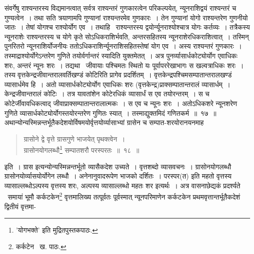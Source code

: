 \documentclass[11pt, openany]{book}
\begin{document}
\noindent संवर्गेषु राश्यन्तरस्य विद्यमानत्वात् सर्वत्र राश्यन्तरं गुणकारत्वेन परिकल्पयेत्, न्यूनराशिद्वयं राश्यन्तरं च गुण्यत्वेन~। तथा सति त्रयाणामपि गुण्यानां राश्यन्तरमेव गुणकारः~। तेन गुण्यानां योगो राश्यन्तरेण गुणनीयो जातः~। तेषां योगश्च राश्योर्योग एव~। तथाहि \textendash\ राश्यन्तरस्य द्वयोर्न्यूनराश्योश्चात्र योगः कर्तव्यः~। तत्रैकस्य न्यूनराशेः राश्यन्तरस्य च योगे कृते सोऽधिकराशिर्भवति, अन्तरसहितस्य न्यूनराशेरधिकराशित्वात्~। तस्मिन् पुनरितरो न्यूनराशिर्योजनीयः ततोऽधिकराशिर्न्यूनराशिसहितस्तेषां योग एव~। अस्य राश्यन्तरं गुणकारः~। तस्माद्राश्योर्योगेऽन्तरेण गुणिते तयोर्वर्गान्तरं स्यादिति युक्तमेतत्~। अत्र पुनर्व्यासार्धकोट्योर्योग एवाधिकः शरः, अन्तरं न्यूनः शरः~। तद्यथा \textendash\ जीवायाः पश्चिमतः स्थितो यः पूर्वापररेखाभागः स खल्वत्राधिकः शरः~। तस्य वृत्तकेन्द्रजीवान्तरालवर्तिखण्डं कोटिरिति प्रागेव प्रदर्शितम्~। वृत्तकेन्द्रपश्चिमसम्पातान्तरालखण्डं व्यासार्धमेव हि~। अतो व्यासार्धकोट्योर्योग एवाधिकः शरः (वृत्तकेन्द्र)प्राक्सम्पातान्तरालं व्यासार्धम्~। केन्द्रजीवान्तरालं कोटिः~। तत्र यावतांशेन कोटेरधिकं व्यासार्धं स एव तयोरन्तरम्~। स च कोटेर्जीवावधिकत्वाद् जीवाप्राक्सम्पातान्तरालात्मकः~। स एव च न्यूनः शरः~। अतोऽधिकशरे न्यूनशरेण गुणिते व्यासार्धकोट्योर्योगस्तयोरन्तरेण गुणितः स्यात्~। तस्माद्युक्तमिदं गणितकर्म~॥~१७~॥\\

अथान्योन्यस्मिन्नन्तर्भूतैकदेशयोर्विषमयोर्वृत्तयोर्व्यासाभ्यां ग्रासेन च सम्पात-शरयोरानयनमाह\textendash 

\begin{quote}
{\ab ग्रासोने द्वे वृत्ते ग्रासगुणे भाजयेत् पृथक्त्वेन~।\\
ग्रासोनयोगलब्धौ\renewcommand{\thefootnote}{*}\footnote{'योगभक्ते' इति मुद्रितपुस्तकपाठः.} सम्पातशरौ परस्परतः~॥~१८~॥}
\end{quote}

इति~। ग्रास इत्यन्योन्यस्मिन्नन्तर्भूतो व्यासैकदेश उच्यते~। वृत्तशब्दो व्यासवचनः~। ग्रासोनयोगलब्धौ ग्रासोनयोर्व्यासयोर्योगेन लब्धौ~। अनेनानुवादरूपेण भाजको दर्शितः~। परस्पर(त) इति महतो वृत्तस्य व्यासाल्लब्धोऽल्पस्य वृत्तस्य शरः, अल्पस्य व्यासाल्लब्धो महतः शर इत्यर्थः~। अत्र वासनाछेद्यकं प्रदर्श्यते \textendash\ समायां भूमौ कर्कटकेन\renewcommand{\thefootnote}{१}\footnote{कर्कटेन \textendash\ ख. पाठः.} वृत्तमालिख्य तत्पूर्वतः पूर्वस्मात् न्यूनपरिमाणेन कर्कटकेन प्रथमवृत्तान्तर्भूतैकदेशं द्वितीयं वृत्तमा-

\newpage
\end{document}
